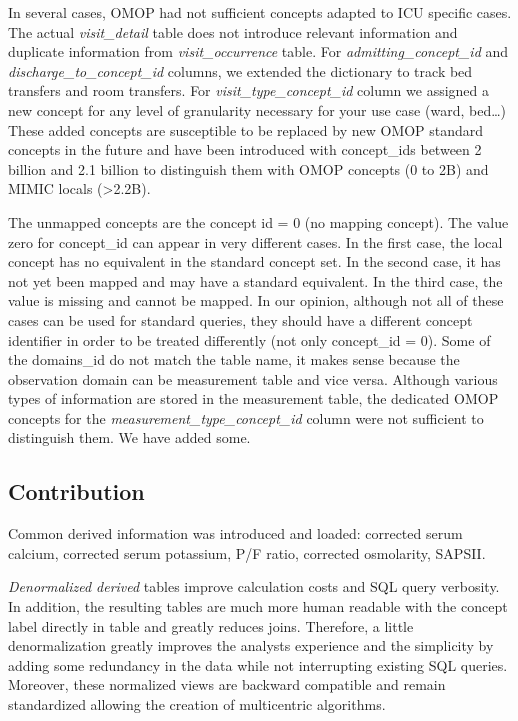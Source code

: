 In several cases, OMOP had not sufficient concepts adapted to ICU specific
cases.  The actual \textit{visit\_detail} table does not introduce relevant
information and duplicate information from \textit{visit\_occurrence} table.
For \textit{admitting\_concept\_id} and \textit{discharge\_to\_concept\_id}
columns, we extended the dictionary to track bed transfers and room transfers.
For \textit{visit\_type\_concept\_id} column we assigned a new concept for any
level of granularity necessary for your use case (ward, bed\ldots) These added
concepts are susceptible to be replaced by new OMOP standard concepts in the
future and have been introduced with concept\_ids between 2 billion and 2.1
billion to distinguish them with OMOP concepts (0 to 2B) and MIMIC locals
(>2.2B).

The unmapped concepts are the concept id = 0 (no mapping concept).  The value
zero for concept\_id can appear in very different cases. In the first case, the
local concept has no equivalent in the standard concept set. In the second
case, it has not yet been mapped and may have a standard equivalent. In the
third case, the value is missing and cannot be mapped. In our opinion, although
not all of these cases can be used for standard queries, they should have a
different concept identifier in order to be treated differently (not only
concept\_id = 0). Some of the domains\_id do not match the table name, it makes
sense because the observation domain can be measurement table and vice versa.
Although various types of information are stored in the measurement table, the
dedicated OMOP concepts for the \textit{measurement\_type\_concept\_id} column
were not sufficient to distinguish them. We have added some. 

%
%
\subsection{Contribution}
Common derived information was introduced and loaded: corrected serum calcium,
corrected serum potassium, P/F ratio, corrected osmolarity, SAPSII.

\emph{Denormalized derived} tables improve calculation costs and SQL query verbosity. 
In addition, the resulting tables are much more human readable with the concept 
label directly in table and greatly reduces joins. Therefore, a little 
denormalization greatly improves the analysts experience and the simplicity
 by adding some redundancy in the data while not interrupting existing SQL queries. 
Moreover, these normalized views are backward compatible and remain 
standardized allowing the creation of multicentric algorithms.

